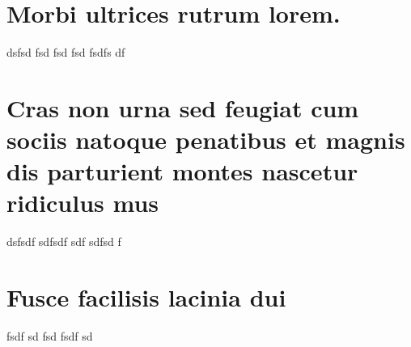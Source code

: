 
\begin{anexosenv}

\partanexos

\chapter{Morbi ultrices rutrum lorem.}
dsfsd fsd fsd fsd fsdfs df

\chapter{Cras non urna sed feugiat cum sociis natoque penatibus et magnis dis
parturient montes nascetur ridiculus mus}

dsfsdf  sdfsdf sdf sdfsd f

\chapter{Fusce facilisis lacinia dui}

fsdf sd fsd fsdf sd

\end{anexosenv}